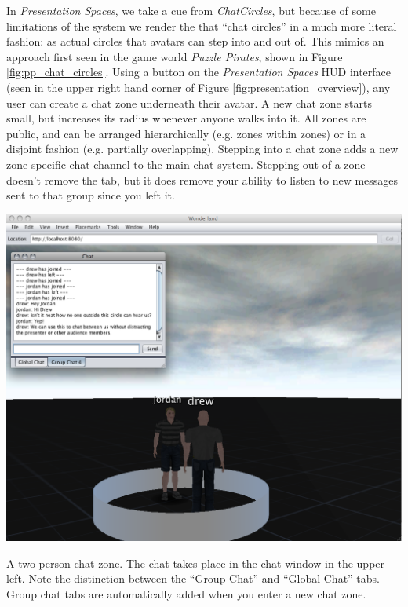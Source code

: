 In \emph{Presentation Spaces}, we take a cue from \emph{ChatCircles}, but because of some limitations of the system we render the that ``chat circles'' in a much more literal fashion: as actual circles that avatars can step into and out of. This mimics an approach first seen in the game world \emph{Puzzle Pirates}, shown in Figure \ref{fig:pp_chat_circles}. Using a button on the \emph{Presentation Spaces} HUD interface (seen in the upper right hand corner of Figure \ref{fig:presentation_overview}), any user can create a chat zone underneath their avatar. A new chat zone starts small, but increases its radius whenever anyone walks into it. All zones are public, and can be arranged hierarchically (e.g. zones within zones) or in a disjoint fashion (e.g. partially overlapping). Stepping into a chat zone adds a new zone-specific chat channel to the main chat system. Stepping out of a zone doesn't remove the tab, but it does remove your ability to listen to new messages sent to that group since you left it.

\begin{marginfigure}
	\includegraphics{figures/chat-zones.png}
	\caption{A two-person chat zone. The chat takes place in the chat window in the upper left. Note the distinction between the ``Group Chat'' and ``Global Chat'' tabs. Group chat tabs are automatically added when you enter a new chat zone.}
	\label{fig:chat_zones}
\end{marginfigure}

